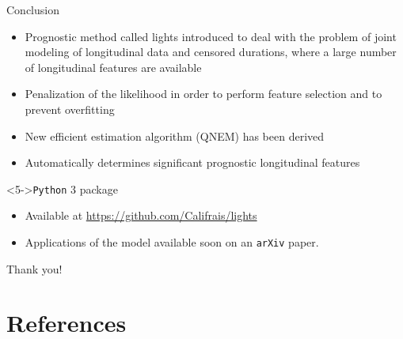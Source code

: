 \documentclass{beamer}
\begin{document}
\begin{frame}{Conclusion}

\begin{itemize}
  \item<1-> Prognostic method called lights introduced to deal with the problem of joint modeling of longitudinal data and censored durations, where a large number of longitudinal features are available
  \item<2-> Penalization of the likelihood in order to perform feature selection and to prevent overfitting
  \item<3-> New efficient estimation algorithm (QNEM) has been derived
  \item<4-> Automatically determines significant prognostic longitudinal features
\end{itemize}

\begin{block}<5->{\texttt{Python} 3 package}
\begin{itemize}
  \item<5-> Available at \small{\url{https://github.com/Califrais/lights}}
  \item<6-> Applications of the model available soon on an \texttt{arXiv} paper.
\end{itemize}
\end{block}

\end{frame}

\begin{frame}[noframenumbering]
\Large \centering
\textcolor{blue_pres}{} Thank you!
\end{frame}

\section{References}
\end{document}
